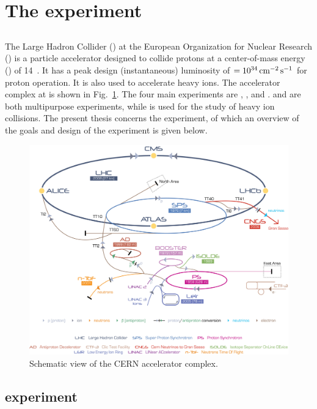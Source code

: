 \section{The \lhcb experiment}
\label{sec:lhcb}

\subsection{\lhc}
\label{sec:lhcb:lhc}

The Large Hadron Collider (\lhc) at the European Organization for Nuclear Research (\cern) is a particle accelerator designed to collide protons at a center-of-mass energy (\sqs) of 14\tev~\cite{lhc}. It has a peak design (instantaneous) luminosity of \lum$= 10^{34}\mathrm{ \,cm}^{-2}\mathrm{{\,s}}^{-1}$ for proton operation. It is also used to accelerate heavy ions. The accelerator complex at \cern is shown in Fig.~\ref{fig:lhc}. The four main experiments are \atlas, \cms, \lhcb and \alice. \atlas and \cms are both multipurpose experiments, while \alice is used for the study of heavy ion collisions. The present thesis concerns the \lhcb experiment, of which an overview of the goals and design of the experiment is given below.

\begin{figure}[!b]
\centering
\includegraphics[width=\textwidth]{figs/detector/lhc.jpg}
\caption{Schematic view of the CERN accelerator complex.}
\label{fig:lhc}
\end{figure}

\subsection{\lhcb experiment}
\label{sec:lhcb:lhcb}

